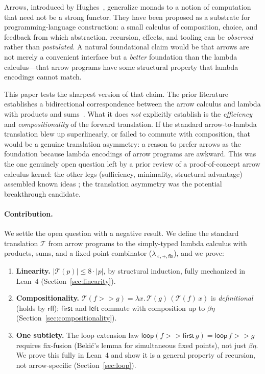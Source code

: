 \documentclass[11pt,a4paper]{article}
\theoremstyle{definition}
\theoremstyle{remark}
\newcommand{\comp}{\mathbin{>\!\!>}}
\newcommand{\first}{\mathsf{first}}
\newcommand{\leftc}{\mathsf{left}}
\newcommand{\loopop}{\mathsf{loop}}
\newcommand{\fix}{\mathsf{fix}}
\newcommand{\T}{\mathcal{T}}
\newcommand{\stlc}{\lambda_{\times,+,\fix}}
\newcommand{\size}[1]{\lvert #1 \rvert}
\begin{document}
Arrows, introduced by Hughes~\cite{hughes2000}, generalize monads to a
notion of computation that need not be a strong functor. They have been
proposed as a substrate for programming-language construction: a small
calculus of composition, choice, and feedback from which abstraction,
recursion, effects, and tooling can be \emph{observed} rather than
\emph{postulated}. A natural foundational claim would be that arrows are
not merely a convenient interface but a \emph{better} foundation than the
lambda calculus---that arrow programs have some structural property that
lambda encodings cannot match.

This paper tests the sharpest version of that claim. The prior literature
establishes a bidirectional correspondence between the arrow calculus and
lambda with products and sums~\cite{lindley2008arrow}. What it does
\emph{not} explicitly establish is the \emph{efficiency} and
\emph{compositionality} of the forward translation. If the standard
arrow-to-lambda translation blew up superlinearly, or failed to commute
with composition, that would be a genuine translation asymmetry: a reason
to prefer arrows as the foundation because lambda encodings of arrow
programs are awkward. This was the one genuinely open question left by a
prior review of a proof-of-concept arrow calculus kernel: the other legs
(sufficiency, minimality, structural advantage) assembled known ideas
\cite{hughes2000,lindley2008arrow,kiselyov2013freer}; the translation
asymmetry was the potential breakthrough candidate.

\paragraph{Contribution.}
We settle the open question with a negative result. We define the standard
translation $\T$ from arrow programs to the simply-typed lambda calculus
with products, sums, and a fixed-point combinator ($\stlc$), and we prove:

\begin{enumerate}
\item \textbf{Linearity.} $\size{\T(p)} \leq 8\cdot\size{p}$, by structural
  induction, fully mechanized in Lean~4 (Section~\ref{sec:linearity}).
\item \textbf{Compositionality.} $\T(f \comp g) = \lambda x.\, \T(g)\,(\T(f)\,x)$
  is \emph{definitional} (holds by $\mathsf{rfl}$); $\first$ and $\leftc$
  commute with composition up to $\beta\eta$ (Section~\ref{sec:compositionality}).
\item \textbf{One subtlety.} The loop extension law
  $\loopop(f \comp \first\,g) = \loopop\,f \comp g$ requires fix-fusion
  (Beki\'c's lemma for simultaneous fixed points), not just $\beta\eta$.
  We prove this fully in Lean~4 and show it is a general property of
  recursion, not arrow-specific (Section~\ref{sec:loop}).
\end{enumerate}
\end{document}
